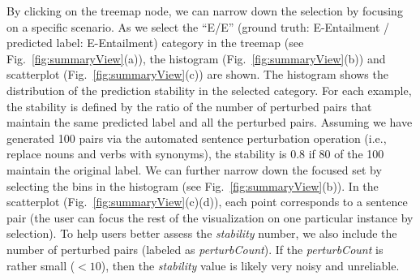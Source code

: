By clicking on the treemap node, we can narrow down the selection by focusing on a specific scenario.
As we select the ``E/E'' (ground truth: E-Entailment / predicted label: E-Entailment) category in the treemap (see Fig.~\ref{fig:summaryView}(a)), the histogram (Fig.~\ref{fig:summaryView}(b)) and scatterplot  (Fig.~\ref{fig:summaryView}(c)) are shown. The histogram shows the distribution of the prediction stability in the selected category. For each example, the stability is defined by the ratio of the number of perturbed pairs that maintain the same predicted label and all the perturbed pairs. Assuming we have generated 100 pairs via the automated sentence perturbation operation (i.e., replace nouns and verbs with synonyms), the stability is 0.8 if 80 of the 100 maintain the original label. 
%
We can further narrow down the focused set by selecting the bins in the histogram (see Fig.~\ref{fig:summaryView}(b)).
%
In the scatterplot (Fig.~\ref{fig:summaryView}(c)(d)), each point corresponds to a sentence pair (the user can focus the rest of the visualization on one particular instance by selection). To help users better assess the \emph{stability} number, we also include the number of perturbed pairs (labeled as \emph{perturbCount}). If the \emph{perturbCount} is rather small ($<10$), then the \emph{stability} value is likely very noisy and unreliable. %



